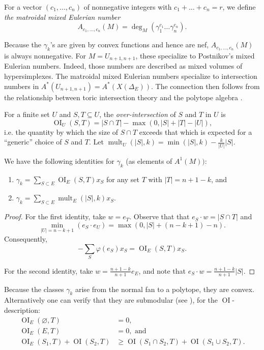 \documentclass[ALCO,published]{cedram}
\numberwithin{equation}{section}
\numberwithin{figure}{section}
\DeclareMathOperator{\OI}{OI}
\DeclareMathOperator{\mult}{mult}
\begin{document}
\begin{defi}
For a vector $(c_1,\dots,c_n)$ of nonnegative integers with $c_1+\dots+c_n=r$, we define {\em the matroidal mixed Eulerian number}
\[A_{c_1,\dots,c_n}(M)=\deg_M(\gamma_1^{c_1}\dots\gamma_n^{c_n}).\]
\end{defi}

Because the $\gamma_k$'s are given by convex functions and hence are nef, $A_{c_1,\dots,c_n}(M)$ is always nonnegative. For $M=U_{n+1,n+1}$, these specialize to Postnikov's mixed Eulerian numbers. Indeed, those numbers are described as mixed volumes of hypersimplexes. The matroidal mixed Eulerian numbers specialize to intersection numbers in $A^*(U_{n+1,n+1})=A^*(X(\Delta_{E}))$. The connection then follows from the relationship between toric intersection theory and the polytope algebra \cite{FultonSturmfels}.

For a finite set $U$ and
$S,T\subseteq U$, the {\em over-intersection} of $S$ and $T$ in $U$ is
\[\OI_{U}(S,T)=|S\cap T|-\max(0,|S|+|T|-|U|),\]
i.e. the quantity by which the size of $S\cap T$ exceeds that which is expected for a ``generic'' choice of $S$ and $T$.
Let $\mult_{U}(|S|,k)=\min(|S|,k)-\frac{k}{|U|}|S|$.

\begin{lemma} \label{l:weights} We have the following identities for $\gamma_k$ (as elements of $A^1(M))$:
\begin{enumerate}
    \item $\gamma_k=\sum_{S\subset E} \OI_{E}(S,T)x_S$ for any set $T$ with $|T|=n+1-k$, and
    \item $\gamma_k=\sum_{S\subset E} \mult_{E}(|S|,k) x_S$.
\end{enumerate}
\end{lemma}

\begin{proof}
For the first identity, take $w=e_T$. Observe that that $e_S\cdot w=|S\cap T|$ and 
\[\min_{|U|=n-k+1}(e_S\cdot e_U)=\max(0,|S|+(n-k+1)-n).\]
Consequently, 
\[-\sum_S \varphi(e_S)x_S=\OI_{E}(S,T)x_S.\]

For the second identity, take $w=\frac{n+1-k}{n+1}e_{E}$, and note that $e_S\cdot w=\frac{n+1-k}{n+1}|S|$. 
\end{proof}

Because the classes $\gamma_k$ arise from the normal fan to a polytope, they are convex. Alternatively one can verify that they are submodular (see \cite[p.~397]{AHK}), \eg for the $\OI$-description:
\begin{align*}
    \OI_{E}(\varnothing,T)&=0,\\
    \OI_{E}(E,T)&=0, \text{ and}\\
    \OI_{E}(S_1,T)+\OI(S_2,T)&\geq \OI(S_1\cap S_2,T)+\OI(S_1\cup S_2,T).
\end{align*}
\end{document}
